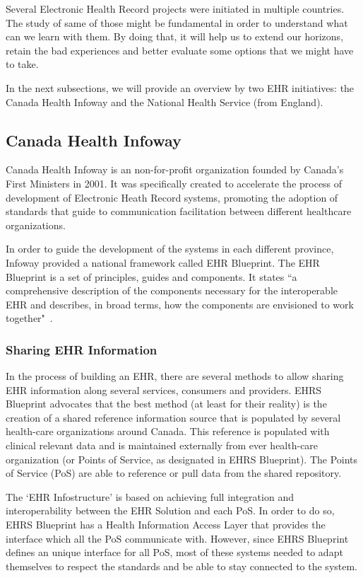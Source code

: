 Several Electronic Health Record projects were initiated in multiple countries. The study of same of those might be fundamental in order to understand what can we learn with them. By doing that, it will help us to extend our horizons, retain the bad experiences and better evaluate some options that we might have to take.

In the next subsections, we will provide an overview by two EHR initiatives: the Canada Health Infoway and the National Health Service (from England).

\subsection{Canada Health Infoway}

Canada Health Infoway is an non-for-profit organization founded by Canada's First Ministers in 2001. It was specifically created to accelerate the process of development of Electronic Heath Record systems, promoting the adoption of standards that guide to communication facilitation between different healthcare organizations. 

In order to guide the development of the systems in each different province, Infoway provided a national framework called EHR Blueprint. The EHR Blueprint is a set of principles, guides and components. It states ``a comprehensive description of the components necessary for the interoperable EHR and describes, in broad terms, how the components are envisioned to work together"~\citep{April2006}.

\subsubsection{Sharing EHR Information} \label{sec:share-ehri}
In the process of building an EHR, there are several methods to allow sharing EHR information along several services, consumers and providers. EHRS Blueprint advocates that the best method (at least for their reality) is the creation of a shared reference information source that is populated by several health-care organizations around Canada. This reference is populated with clinical relevant data and is maintained externally from ever health-care organization (or Points of Service, as designated in EHRS Blueprint). The Points of Service (PoS) are able to reference or pull data from the shared repository.

The `EHR Infostructure' is based on achieving full integration and interoperability between the EHR Solution and each PoS. In order to do so, EHRS Blueprint has a Health Information Access Layer that provides the interface which all the PoS communicate with. However, since EHRS Blueprint defines an unique interface for all PoS, most of these systems needed to adapt themselves to respect the standards and be able to stay connected to the system. 

